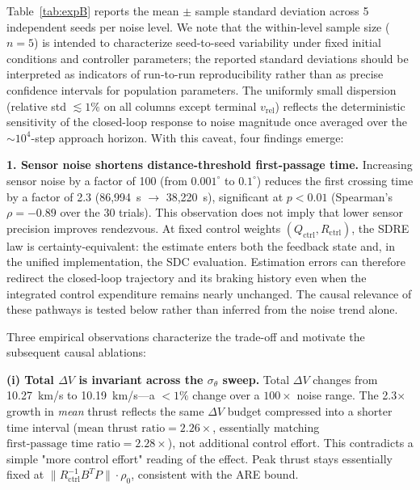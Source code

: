 \documentclass[preprint,3p,times]{elsarticle}
\begin{document}
Table~\ref{tab:expB} reports the mean $\pm$ sample standard deviation across 5 independent seeds per noise level. We note that the within-level sample size ($n = 5$) is intended to characterize seed-to-seed variability under fixed initial conditions and controller parameters; the reported standard deviations should be interpreted as indicators of run-to-run reproducibility rather than as precise confidence intervals for population parameters. The uniformly small dispersion (relative std $\lesssim 1\%$ on all columns except terminal $v_{\text{rel}}$) reflects the deterministic sensitivity of the closed-loop response to noise magnitude once averaged over the ${\sim}10^4$-step approach horizon. With this caveat, four findings emerge:

\textbf{1. Sensor noise shortens distance-threshold first-passage time.} Increasing sensor noise by a factor of 100 (from $0.001^\circ$ to $0.1^\circ$) reduces the first crossing time by a factor of 2.3 (86{,}994~s $\to$ 38{,}220~s), significant at $p < 0.01$ (Spearman's $\rho = -0.89$ over the 30 trials). This observation does not imply that lower sensor precision improves rendezvous. At fixed control weights $(Q_{\text{ctrl}}, R_{\text{ctrl}})$, the SDRE law is certainty-equivalent: the estimate enters both the feedback state and, in the unified implementation, the SDC evaluation. Estimation errors can therefore redirect the closed-loop trajectory and its braking history even when the integrated control expenditure remains nearly unchanged. The causal relevance of these pathways is tested below rather than inferred from the noise trend alone.

Three empirical observations characterize the trade-off and motivate the subsequent causal ablations:

\textbf{(i) Total $\Delta V$ is invariant across the $\sigma_\theta$ sweep.} Total $\Delta V$ changes from 10.27~km/s to 10.19~km/s---a ${<}1\%$ change over a $100\times$ noise range. The 2.3$\times$ growth in \emph{mean} thrust reflects the same $\Delta V$ budget compressed into a shorter time interval ($\text{mean thrust ratio}=2.26\times$, essentially matching $\text{first-passage time ratio}=2.28\times$), not additional control effort. This contradicts a simple "more control effort" reading of the effect. Peak thrust stays essentially fixed at $\|R_{\text{ctrl}}^{-1} B^T P\| \cdot \rho_0$, consistent with the ARE bound.
\end{document}

